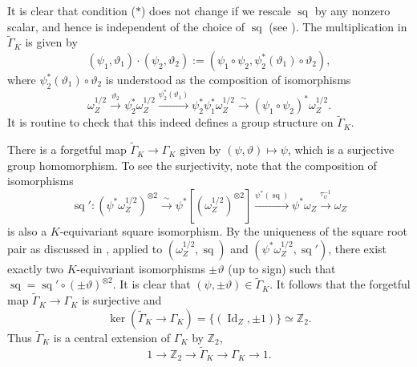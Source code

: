 \documentclass[11pt, a4paper]{amsart}
\newcommand{\Z}{\mathbb{Z}}
\newcommand{\tGamma}{\widetilde{\Gamma}}
\DeclareMathOperator{\sq}{sq}
\newcommand{\Id}{\operatorname{Id}}
\newcommand{\smallhalf}{{\scriptscriptstyle 1/2}}
\theoremstyle{definition}
\numberwithin{equation}{section}
\begin{document}
It is clear that condition ($\ast$) does not change if we rescale $\sq$ by any nonzero scalar, and hence is independent of the choice of $\sq$ (see ).
The multiplication in $\tGamma_K$ is given by
	\[ (\psi_1, \vartheta_1) \cdot (\psi_2, \vartheta_2) := (\psi_1 \circ \psi_2, \psi_2^* (\vartheta_1) \circ \vartheta_2), \]
where $\psi_2^* (\vartheta_1) \circ \vartheta_2$ is understood as the composition of isomorphisms
\begin{equation} \label{eq:mult_tilde_Gamma_K}
	\omega_Z^{\smallhalf} \xrightarrow{\vartheta_2} \psi_2^* \omega_Z^{\smallhalf} \xrightarrow{\psi_2^* (\vartheta_1)} \psi_2^* \psi_1^* \omega_Z^{\smallhalf} \xrightarrow{\,\sim\,} (\psi_1 \circ \psi_2)^* \omega_Z^{\smallhalf}.
\end{equation}
It is routine to check that this indeed defines a group structure on $\tGamma_K$.

There is a forgetful map $\tGamma_K \to \Gamma_K$ given by $(\psi, \vartheta) \mapsto \psi$, which is a surjective group homomorphism. 
To see the surjectivity, note that the composition of isomorphisms 
\[
    \sq': (\psi^* \omega_Z^{\smallhalf})^{\otimes 2} \xrightarrow{\,\sim\,} \psi^* \left[ (\omega_Z^{\smallhalf})^{\otimes 2} \right] \xrightarrow{\psi^*(\sq)} \psi^* \omega_Z  \xrightarrow{\tau_\psi^{-1}} \omega_Z
\]
is also a $K$-equivariant square isomorphism.
By the uniqueness of the square root pair as discussed in , applied to $(\omega_Z^{\smallhalf}, \sq)$ and $(\psi^* \omega_Z^{\smallhalf}, \sq')$, there exist exactly two $K$-equivariant isomorphisms $\pm \vartheta$ (up to sign) such that $\sq = \sq' \circ (\pm \vartheta)^{\otimes 2}$. It is clear that $(\psi, \pm \vartheta) \in \tGamma_K$.
It follows that the forgetful map $\tGamma_K \to \Gamma_K$ is surjective and 
\[
    \ker(\tGamma_K \to \Gamma_K) = \{ (\Id_Z, \pm 1) \} \simeq \Z_2.
\]
Thus $\tGamma_K$ is a central extension of $\Gamma_K$ by $\Z_2$,
\begin{equation} \label{eq:extn_Gamma_K}
	1 \to \Z_2 \to \tGamma_K \to \Gamma_K \to 1. 
\end{equation}
\end{document}
